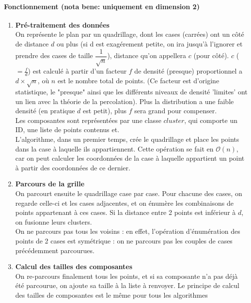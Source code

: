 \documentclass[a4paper,11pt]{article}
\begin{document}
	\paragraph{Fonctionnement (nota bene: uniquement en dimension 2)}
	\begin{enumerate}
		\item \textbf{Pré-traitement des données} \\
			On représente le plan par un quadrillage, dont les cases (carrées) ont un côté de distance $d$ ou plus (si d est exagérement petite, on ira jusqu'à l'ignorer et prendre des cases de taille $\dfrac{1}{\sqrt{n}}$), distance qu'on appellera $c$ (pour côté). $c$ ($=\frac{f}{d}$) est calculé à partir d'un facteur $f$ de densité (presque) proportionnel a $d \times \sqrt{n}$, où $n$ est le nombre total de points. (Ce facteur est d'origine statistique, le "presque" ainsi que les différents niveaux de densité 'limites' ont un lien avec la théorie de la percolation).
			\smallbreak
			Plus la distribution a une faible densité (en pratique $d$ est petit), plus $f$ sera grand pour compenser. \\
Les composantes sont représentées par une classe $cluster$, qui comporte un ID, une liste de points contenus et.\\
L'algorithme, dans un premier temps, crée le quadrillage et place les points dans la case à laquelle ils appartiennent. Cette opération se fait en $\mathcal{O}(n)$, car on peut calculer les coordonnées de la case à laquelle appartient un point à partir des coordonnées de ce dernier.\\
		\item \textbf{Parcours de la grille} \\
		On parcourt ensuite le quadrillage case par case. Pour chacune des cases, on regarde celle-ci et les cases adjacentes, et on énumère les combinaisons de points appartenant à ces cases. Si la distance entre 2 points est inférieur à $d$, on fusionne leurs clusters.\\
On ne parcours pas tous les voisins : en effet, l'opération d'énumération des points de 2 cases est symétrique : on ne parcours pas les couples de cases précédemment parcourues.\\
        \item \textbf{Calcul des tailles des composantes} \\
On re-parcours finalement tous les points, et si sa composante n'a pas déjà été parcourue, on ajoute sa taille à la liste à renvoyer.
\smallbreak
Le principe de calcul des tailles de composantes est le même pour tous les algorithmes
	\end{enumerate}
		
\end{document}
